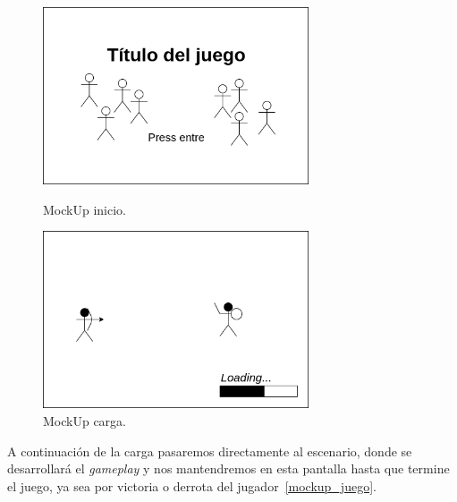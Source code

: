 \begin{figure}[h]
\centering
\begin{minipage}[c]{0.42\linewidth}
	\hspace{9mm}
	\includegraphics[width=0.7\textwidth]{imagenes/gdd/pantallas/Pantalla_ini.png}
	\caption{MockUp inicio.}
	\label{mockup_ini}
\end{minipage}
\begin{minipage}[c]{0.42\linewidth}
	\hspace{9mm}
	\includegraphics[width=0.7\textwidth]{imagenes/gdd/pantallas/Pantalla_carga.png}
	\caption{MockUp carga.}
	\label{mockup_carga}
\end{minipage}	
\end{figure}

A continuación de la carga pasaremos directamente al escenario, donde se desarrollará el
\textit{gameplay} y nos mantendremos en esta pantalla hasta que termine el juego, ya sea
por victoria o derrota del jugador~\ref{mockup_juego}.

